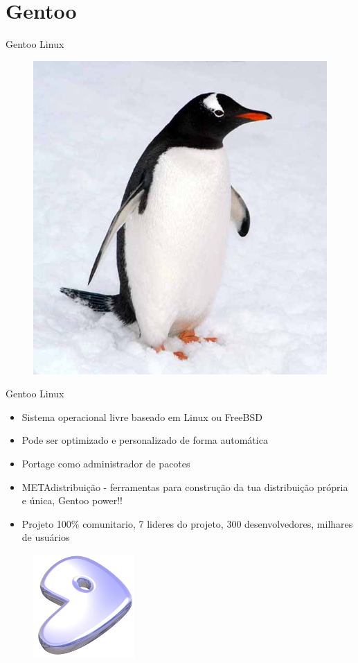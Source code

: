 \documentclass{beamer}
\begin{document}
\section{Gentoo}
\begin{frame}{Gentoo Linux}
\begin{figure}[tbph]
\centering
\includegraphics[width=0.7\linewidth]{./gentoo1}
\end{figure}
\end{frame}


\begin{frame}{Gentoo Linux}
\begin{itemize}
\item Sistema operacional livre baseado em Linux ou FreeBSD
\item Pode ser optimizado e personalizado de forma automática
\item Portage como administrador de pacotes
\item METAdistribuição - ferramentas para construção da tua distribuição própria e única, Gentoo power!!
\item Projeto 100\% comunitario, 7 lideres do projeto, 300 desenvolvedores, milhares de usuários
\end{itemize}
\begin{figure}[tbph]
\centering
\includegraphics[width=0.1\linewidth]{./glogo-small.png}
\end{figure}
\end{frame}
\end{document}
